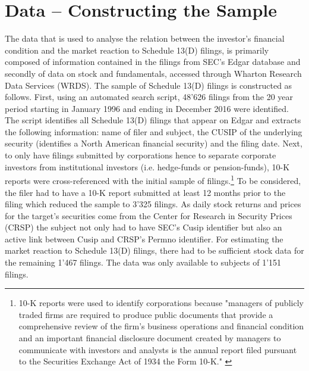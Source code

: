 \documentclass[12pt]{article}
\begin{document}
\section{Data -- Constructing the Sample}

\noindent The data that is used to analyse the relation between the investor's financial condition and the market reaction to Schedule 13(D) filings,  is primarily composed of information contained in the filings from SEC's Edgar database and secondly of data on stock and fundamentals,  accessed through Wharton Research Data Services (WRDS). The sample of Schedule 13(D) filings is constructed as follows. First, using an automated search script, 48'626 filings from the 20 year period starting in January 1996 and ending in December 2016 were identified.  The script identifies all Schedule 13(D) filings that appear on Edgar and extracts the following information: name of filer and subject, the CUSIP of the underlying security (identifies a North American financial security) and the filing date. Next, to only have filings submitted by corporations hence to separate corporate investors from institutional investors (i.e. hedge-funds or pension-funds), 10-K reports were cross-referenced with the initial sample of filings.\footnote{10-K reports were used to identify corporations because "managers of publicly traded firms are required to produce public documents that provide a comprehensive review of the firm’s business operations and financial condition and an important financial disclosure document created by managers to communicate with investors and analysts is the annual report filed pursuant to the Securities Exchange Act of 1934 the Form 10-K." \citep[p. 1643]{Loughran2014}} To be considered, the filer had to have a 10-K report submitted at least 12 months prior to the filing which reduced the sample to 3'325 filings. As daily stock returns and prices for the target's securities come from the Center for Research in Security Prices (CRSP) the subject not only had to have SEC's Cusip identifier but also an active link between Cusip and CRSP's Permno identifier. For estimating the market reaction to Schedule 13(D) filings, there had to be sufficient stock data for the remaining 1'467 filings. The data was only available to subjects of 1'151 filings. 
\end{document}
